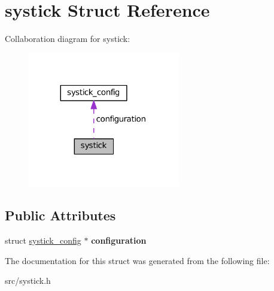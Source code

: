 \hypertarget{structsystick}{}\section{systick Struct Reference}
\label{structsystick}


Collaboration diagram for systick\+:\nopagebreak
\begin{figure}[H]
\begin{center}
\leavevmode
\includegraphics[width=188pt]{structsystick__coll__graph}
\end{center}
\end{figure}
\subsection*{Public Attributes}
\begin{DoxyCompactItemize}
\item 
\hypertarget{structsystick_a6e7d92e68eb2e575624d068b187ace33}{}struct \hyperlink{structsystick__config}{systick\+\_\+config} $\ast$ {\bfseries configuration}\label{structsystick_a6e7d92e68eb2e575624d068b187ace33}

\end{DoxyCompactItemize}


The documentation for this struct was generated from the following file\+:\begin{DoxyCompactItemize}
\item 
src/systick.\+h\end{DoxyCompactItemize}
